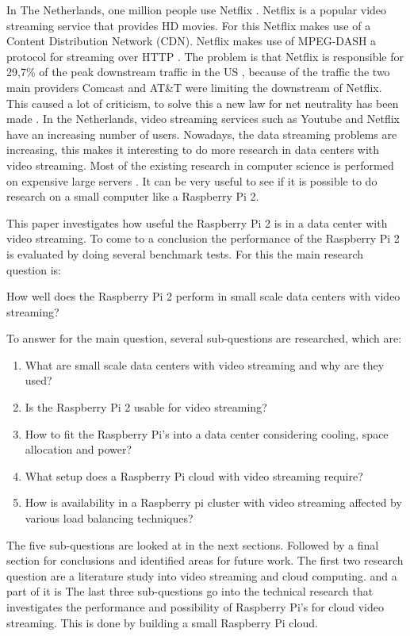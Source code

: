 \documentclass{sig-alternate-br}
\begin{document}
In The Netherlands, one million people use Netflix \cite{volkskrant}. Netflix is a popular video streaming service that provides HD movies. For this Netflix makes use of a Content Distribution Network (CDN). Netflix makes use of MPEG-DASH a protocol for streaming over HTTP \cite{martin:2013}. The problem is that Netflix is responsible for  29,7\% of the peak downstream traffic in the US \cite{Adhikari:2012}, because of the traffic the two main providers Comcast and  AT\&T were limiting the downstream of Netflix. This caused a lot of criticism, to solve this a new law for net neutrality has been made \cite{net-neutrality}. \newline
In the Netherlands, video streaming services such as Youtube and Netflix have an increasing number of users. Nowadays, the data streaming problems are increasing, this makes it interesting to do more research in data centers with video streaming. Most of the existing research in computer science is performed on expensive large servers \cite{tso:2013}. It can be very useful to see if it is possible to do research on a small computer like a Raspberry Pi 2.

This paper investigates how useful the Raspberry Pi 2 is in a data center with video streaming. To come to a conclusion the performance of the Raspberry Pi 2 is evaluated by doing several benchmark tests. For this the main research question is: 
\begin{center}
How well does the Raspberry Pi 2 perform in small scale data centers with video streaming? 
\end{center}

To answer for the main question, several sub-questions are researched, which are:

\begin{enumerate}
	\item What are small scale data centers with video streaming and why are they used?
	\item Is the Raspberry Pi 2 usable for video streaming?
	\item How to fit the Raspberry Pi's into a data center considering cooling, space allocation and power?
	\item What setup does a Raspberry Pi cloud with video streaming require?
	\item How is availability in a Raspberry pi cluster with video streaming affected by various load balancing techniques? 
\end{enumerate}

The five sub-questions are looked at in the next sections. Followed by a final section for conclusions and identified areas for future work.
The first two research question are a literature study into video streaming and cloud computing. and a part of it is  The last three sub-questions go into the technical research that investigates the performance and possibility of Raspberry Pi's for cloud video streaming. This is done by building a small Raspberry Pi cloud. 
\end{document}
